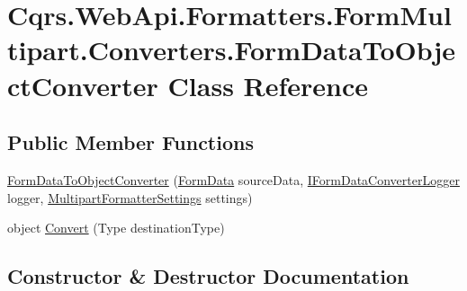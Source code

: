 \hypertarget{classCqrs_1_1WebApi_1_1Formatters_1_1FormMultipart_1_1Converters_1_1FormDataToObjectConverter}{}\section{Cqrs.\+Web\+Api.\+Formatters.\+Form\+Multipart.\+Converters.\+Form\+Data\+To\+Object\+Converter Class Reference}
\label{classCqrs_1_1WebApi_1_1Formatters_1_1FormMultipart_1_1Converters_1_1FormDataToObjectConverter}
\subsection*{Public Member Functions}
\begin{DoxyCompactItemize}
\item 
\hyperlink{classCqrs_1_1WebApi_1_1Formatters_1_1FormMultipart_1_1Converters_1_1FormDataToObjectConverter_aa0552b59a58759bf2691a074c897393d_aa0552b59a58759bf2691a074c897393d}{Form\+Data\+To\+Object\+Converter} (\hyperlink{classCqrs_1_1WebApi_1_1Formatters_1_1FormMultipart_1_1Infrastructure_1_1FormData}{Form\+Data} source\+Data, \hyperlink{interfaceCqrs_1_1WebApi_1_1Formatters_1_1FormMultipart_1_1Infrastructure_1_1Logger_1_1IFormDataConverterLogger}{I\+Form\+Data\+Converter\+Logger} logger, \hyperlink{classCqrs_1_1WebApi_1_1Formatters_1_1FormMultipart_1_1Infrastructure_1_1MultipartFormatterSettings}{Multipart\+Formatter\+Settings} settings)
\item 
object \hyperlink{classCqrs_1_1WebApi_1_1Formatters_1_1FormMultipart_1_1Converters_1_1FormDataToObjectConverter_a1b3d45a20f48b1608a6a68796610c5aa_a1b3d45a20f48b1608a6a68796610c5aa}{Convert} (Type destination\+Type)
\end{DoxyCompactItemize}


\subsection{Constructor \& Destructor Documentation}
\mbox{\label{classCqrs_1_1WebApi_1_1Formatters_1_1FormMultipart_1_1Converters_1_1FormDataToObjectConverter_aa0552b59a58759bf2691a074c897393d_aa0552b59a58759bf2691a074c897393d}} 
